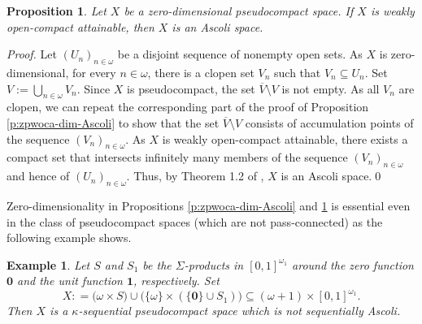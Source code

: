 \documentclass[preprint,11pt]{elsarticle}
\newtheorem{proposition}[theorem]{Proposition}
\newtheorem{example}[theorem]{Example}
\numberwithin{equation}{section}
\numberwithin{theorem}{section}
\newcommand{\w}{\omega}
\begin{document}
\begin{proposition} \label{p:zpwoca-Ascoli}
Let $X$ be a zero-dimensional  pseudocompact space. If $X$ is weakly open-compact attainable, then $X$ is an Ascoli space.
\end{proposition}

\begin{proof}
Let $(U_n)_{n\in\w}$ be a disjoint sequence of nonempty open sets. As $X$ is zero-dimensional, for every $n\in\w$, there is a clopen set $V_n$ such that $V_n\subseteq U_n$. Set $V:=\bigcup_{n\in\w} V_n$. Since $X$ is pseudocompact, the set $\overline{V}\setminus V$ is not empty. As all $V_n$ are clopen,
we can repeat the corresponding part of the proof of Proposition \ref{p:zpwoca-dim-Ascoli} to show that the set $\overline{V}\setminus V$ consists of accumulation points of the sequence $(V_n)_{n\in\w}$. As $X$ is weakly open-compact attainable, there exists a compact set that intersects infinitely many members of the sequence $(V_n)_{n\in\w}$ and hence of $(U_n)_{n\in\w}$. Thus, by Theorem 1.2 of \cite{Gabr-pseudo-Ascoli}, $X$ is an Ascoli space.\qed
\end{proof}




Zero-dimensionality in Propositions \ref{p:zpwoca-dim-Ascoli} and  \ref{p:zpwoca-Ascoli}  is essential even in the class of pseudocompact spaces (which are not pass-connected) as the following example shows.


\begin{example} \label{exa:woca-non-Ascoli}
Let $S$ and $S_1$ be the $\Sigma$-products in $[0,1]^{\w_1}$ around the zero function $\mathbf{0}$ and the unit function $\mathbf{1}$, respectively. Set
\[
X: =\big(\w \times S\big)\cup \Big( \{\w\}\times  (\{\mathbf{0}\}\cup S_1)\Big)\subseteq (\w+1)\times [0,1]^{\w_1}.
\]
Then $X$ is a $\kappa$-sequential pseudocompact space which is not sequentially Ascoli.
\end{example}
\end{document}
